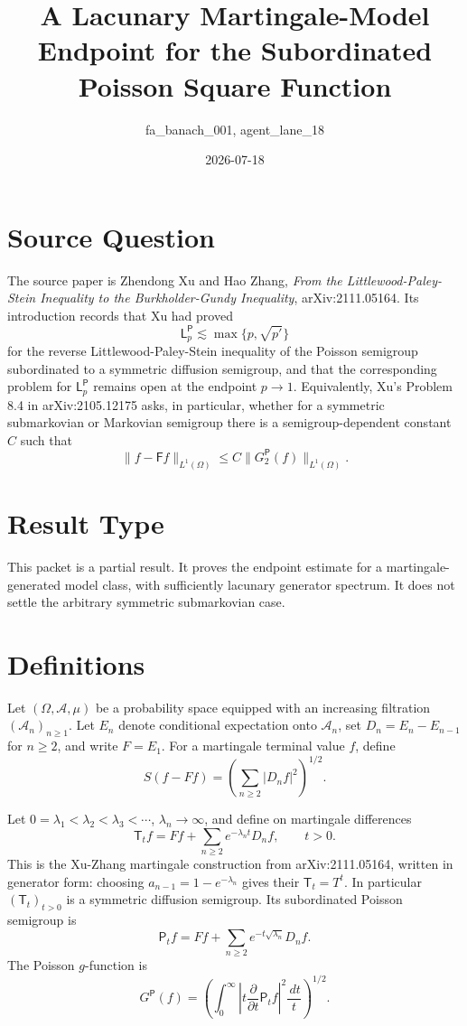 \documentclass[11pt]{article}
\title{A Lacunary Martingale-Model Endpoint for the Subordinated Poisson Square Function}
\author{fa\_banach\_001, agent\_lane\_18}
\date{2026-07-18}
\newcommand{\dd}{\,d}
\newcommand{\sfT}{\mathsf T}
\newcommand{\sfP}{\mathsf P}
\newcommand{\sfF}{\mathsf F}
\begin{document}
\maketitle

\section*{Source Question}

The source paper is Zhendong Xu and Hao Zhang,
\emph{From the Littlewood-Paley-Stein Inequality to the
Burkholder-Gundy Inequality}, arXiv:2111.05164.  Its introduction records that
Xu had proved
\[
  \mathsf L_p^{\sfP}\lesssim \max\{p,\sqrt{p'}\}
\]
for the reverse Littlewood-Paley-Stein inequality of the Poisson semigroup
subordinated to a symmetric diffusion semigroup, and that the corresponding
problem for \(\mathsf L_p^{\sfP}\) remains open at the endpoint \(p\to1\).
Equivalently, Xu's Problem 8.4 in arXiv:2105.12175 asks, in particular,
whether for a symmetric submarkovian or Markovian semigroup there is a
semigroup-dependent constant \(C\) such that
\[
  \|f-\sfF f\|_{L^1(\Omega)}
  \le C\|G^{\sfP}_2(f)\|_{L^1(\Omega)} .
\]

\section*{Result Type}

This packet is a partial result.  It proves the endpoint estimate for a
martingale-generated model class, with sufficiently lacunary generator
spectrum.  It does not settle the arbitrary symmetric submarkovian case.

\section*{Definitions}

Let \((\Omega,\mathcal A,\mu)\) be a probability space equipped with an
increasing filtration \((\mathcal A_n)_{n\ge1}\).  Let \(E_n\) denote conditional
expectation onto \(\mathcal A_n\), set \(D_n=E_n-E_{n-1}\) for \(n\ge2\), and
write \(F=E_1\).  For a martingale terminal value \(f\), define
\[
  S(f-Ff)=\left(\sum_{n\ge2}|D_n f|^2\right)^{1/2}.
\]

Let \(0=\lambda_1<\lambda_2<\lambda_3<\cdots\), \(\lambda_n\to\infty\), and
define on martingale differences
\[
  \sfT_t f = Ff+\sum_{n\ge2} e^{-\lambda_n t}D_n f,\qquad t>0.
\]
This is the Xu-Zhang martingale construction from arXiv:2111.05164, written in
generator form: choosing \(a_{n-1}=1-e^{-\lambda_n}\) gives their
\(\sfT_t=T^t\).  In particular \((\sfT_t)_{t>0}\) is a symmetric diffusion
semigroup.  Its subordinated Poisson semigroup is
\[
  \sfP_t f=Ff+\sum_{n\ge2}e^{-t\sqrt{\lambda_n}}D_n f.
\]
The Poisson \(g\)-function is
\[
  G^{\sfP}(f)
  =\left(\int_0^\infty\left|t\frac{\partial}{\partial t}\sfP_t f\right|^2
       \frac{\dd t}{t}\right)^{1/2}.
\]
\end{document}
